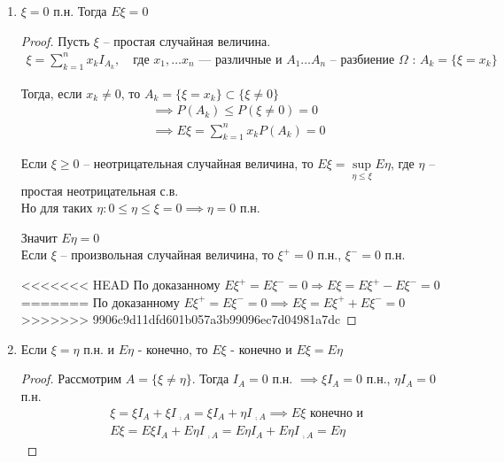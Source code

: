 \begin{enumerate}[resume*=mean_properties]

  \item
    $\xi = 0$ п.н. Тогда $E \xi = 0$

    \begin{proof}
      Пусть $\xi$ -- простая случайная величина.
      \begin{align*}
        \xi = \sum_{k = 1}^{n} x_k I_{A_k}, \quad 
        \text{где $x_1, \ldots x_n$ --- различные и $A_1 \ldots A_n$ --
        разбиение $\Omega$ : $A_k = \{ \xi = x_k \}$}
      \end{align*}

      Тогда, если $x_k \neq 0$, то $A_k = \{ \xi = x_k \} \subset \{ \xi \neq 0 \}$
      \begin{align*}
        &\implies P(A_k) \leq P(\xi \neq 0) = 0\\
        &\implies E \xi = \sum_{k = 1}^{n} x_k P(A_k) = 0
      \end{align*}

      Если $\xi \geq 0$ -- неотрицательная случайная величина, то 
      $E \xi = \sup\limits_{\eta \leq \xi} E \eta$, где $\eta$ -- простая неотрицательная с.в.\\
      Но для таких $\eta: 0 \leq \eta \leq \xi = 0 \implies \eta = 0$ п.н.

      Значит $E \eta = 0$\\

      Если $\xi$ -- произвольная случайная величина, то $\xi^+ = 0$ п.н., $\xi^- = 0$ п.н.

<<<<<<< HEAD
      По доказанному $E \xi^+ = E \xi^- = 0 \Rightarrow E \xi = E \xi^+ - E \xi^- = 0$
=======
      По доказанному $E \xi^+ = E \xi^- = 0 \implies E \xi = E \xi^+ + E \xi^- = 0$
>>>>>>> 9906c9d11dfd601b057a3b99096ec7d04981a7dc
    \end{proof}

  \item
    Если $\xi = \eta$ п.н. и $E \eta$ - конечно, то $E \xi$ - конечно и $E \xi = E \eta$

    \begin{proof}
      Рассмотрим $A = \{\xi \neq \eta\}$. Тогда $I_A = 0$ п.н. $\implies \xi I_A = 0$ п.н.,
      $\eta I_A = 0$ п.н.
      \begin{align*}
        &\xi = \xi I_A + \xi I_{\,\comp{A}} = \xi I_A + \eta I_{\,\comp{A}} 
        \implies E \xi \text{ конечно и }\\
        &E \xi = E \xi I_A + E \eta I_{\,\comp{A}} = E \eta I_A + E \eta I_{\,\comp{A}} = E \eta
      \end{align*}
    \end{proof}


\end{enumerate}
